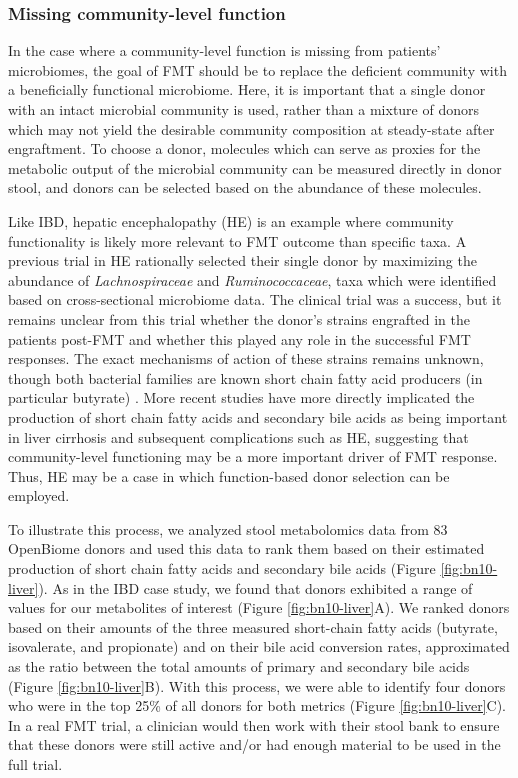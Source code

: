 \subsubsection{Missing community-level function}

In the case where a community-level function is missing from patients' microbiomes, the goal of FMT should be to replace the deficient community with a beneficially functional microbiome.
Here, it is important that a single donor with an intact microbial community is used, rather than a mixture of donors which may not yield the desirable community composition at steady-state after engraftment.
To choose a donor, molecules which can serve as proxies for the metabolic output of the microbial community can be measured directly in donor stool, and donors can be selected based on the abundance of these molecules.

Like IBD, hepatic encephalopathy (HE) is an example where community functionality is likely more relevant to FMT outcome than specific taxa.
A previous trial in HE \cite{Bajaj2017} rationally selected their single donor by maximizing the abundance of \textit{Lachnospiraceae} and \textit{Ruminococcaceae}, taxa which were identified based on cross-sectional microbiome data.
The clinical trial was a success, but it remains unclear from this trial whether the donor's strains engrafted in the patients post-FMT and whether this played any role in the successful FMT responses.
The exact mechanisms of action of these strains remains unknown, though both bacterial families are known short chain fatty acid producers (in particular butyrate) \cite{citation-needed}.
More recent studies have more directly implicated the production of short chain fatty acids and secondary bile acids as being important in liver cirrhosis and subsequent complications such as HE, suggesting that community-level functioning may be a more important driver of FMT response.
Thus, HE may be a case in which function-based donor selection can be employed.

To illustrate this process, we analyzed stool metabolomics data from 83 OpenBiome donors and used this data to rank them based on their estimated production of short chain fatty acids and secondary bile acids (Figure \ref{fig:bn10-liver}).
As in the IBD case study, we found that donors exhibited a range of values for our metabolites of interest (Figure \ref{fig:bn10-liver}A).
We ranked donors based on their amounts of the three measured short-chain fatty acids (butyrate, isovalerate, and propionate) and on their bile acid conversion rates, approximated as the ratio between the total amounts of primary and secondary bile acids (Figure \ref{fig:bn10-liver}B).
With this process, we were able to identify four donors who were in the top 25\% of all donors for both metrics (Figure \ref{fig:bn10-liver}C).
In a real FMT trial, a clinician would then work with their stool bank to ensure that these donors were still active and/or had enough material to be used in the full trial.

